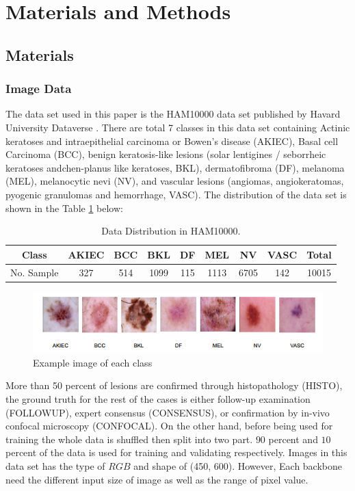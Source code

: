 \documentclass[sensors,article,submit,pdftex,moreauthors]{Definitions/mdpi}
\begin{document}
\section{Materials and Methods}
\subsection{Materials}
\subsubsection{Image Data}
The data set used in this paper is the HAM10000 data set published by Havard University Dataverse \cite{10417}. There are total 7 classes in this data set containing Actinic keratoses and intraepithelial carcinoma or Bowen's disease (AKIEC), Basal cell Carcinoma (BCC),  benign keratosis-like lesions (solar lentigines / seborrheic keratoses andchen-planus like keratoses, BKL), dermatofibroma (DF), melanoma (MEL), melanocytic nevi (NV), and vascular lesions (angiomas, angiokeratomas, pyogenic granulomas and hemorrhage, VASC). The distribution of the data set is shown in the Table \ref{table:data-distribution} below:

\begin{table}[H]
	\centering
	\begin{tabular}{|c c c c c c c c c|} 
		\hline
		Class & AKIEC & BCC & BKL & DF & MEL & NV & VASC & Total \\ 
		\hline
		No. Sample & 327 & 514 & 1099 & 115 & 1113 & 6705 & 142 & 10015 \\
		\hline
	\end{tabular}
	\caption{Data Distribution in HAM10000.}
	\label{table:data-distribution}
\end{table}

\begin{figure}[H]
	\centering
	\includegraphics[width=1\linewidth]{Definitions/DataDistribution}
	\caption{Example image of each class}
	\label{fig:data-sample}
\end{figure}

More than 50 percent of lesions are confirmed through histopathology (HISTO), the ground truth for the rest of the cases is either follow-up examination (FOLLOWUP), expert consensus (CONSENSUS), or confirmation by in-vivo confocal microscopy (CONFOCAL). On the other hand, before being used for training the whole data is shuffled then split into two part. $90$ percent and $10$ percent of the data is used for training and validating respectively. Images in this data set has the type of $RGB$ and shape of (450, 600). However, Each backbone need the different input size of image as well as the range of pixel value.
\end{document}
